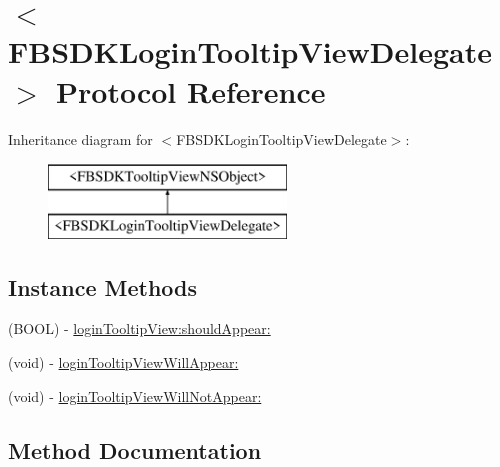 \hypertarget{protocol_f_b_s_d_k_login_tooltip_view_delegate-p}{}\section{$<$F\+B\+S\+D\+K\+Login\+Tooltip\+View\+Delegate$>$ Protocol Reference}
\label{protocol_f_b_s_d_k_login_tooltip_view_delegate-p}
Inheritance diagram for $<$F\+B\+S\+D\+K\+Login\+Tooltip\+View\+Delegate$>$\+:\begin{figure}[H]
\begin{center}
\leavevmode
\includegraphics[height=2.000000cm]{protocol_f_b_s_d_k_login_tooltip_view_delegate-p}
\end{center}
\end{figure}
\subsection*{Instance Methods}
\begin{DoxyCompactItemize}
\item 
(B\+O\+O\+L) -\/ \hyperlink{protocol_f_b_s_d_k_login_tooltip_view_delegate-p_a06836f97a9070875bf9f149cb9987eb2}{login\+Tooltip\+View\+:should\+Appear\+:}
\item 
(void) -\/ \hyperlink{protocol_f_b_s_d_k_login_tooltip_view_delegate-p_a9cac62d13ab2da0643973eabbee90797}{login\+Tooltip\+View\+Will\+Appear\+:}
\item 
(void) -\/ \hyperlink{protocol_f_b_s_d_k_login_tooltip_view_delegate-p_a0e6a4d3a7dc522fc1ab55e5bacfa0042}{login\+Tooltip\+View\+Will\+Not\+Appear\+:}
\end{DoxyCompactItemize}


\subsection{Method Documentation}
\hypertarget{protocol_f_b_s_d_k_login_tooltip_view_delegate-p_a06836f97a9070875bf9f149cb9987eb2}{}
